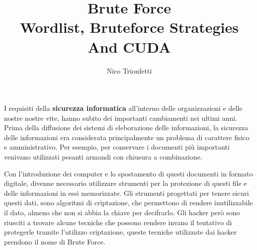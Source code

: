 \documentclass[a4paper]{unicam_thesis}
\title{Brute Force \\ Wordlist, Bruteforce Strategies And CUDA }
\author{Nico Trionfetti}%
\theoremstyle{definition} \newtheorem{esempio}{Esempio}[chapter]
\theoremstyle{definition}
\begin{document}
\maketitle


\tableofcontents

\abstract

I requisiti della \textbf{sicurezza informatica} all'interno delle organizzazioni e delle nostre nostre vite, hanno subito dei importanti cambiamenti nei ultimi anni. Prima della diffusione dei sistemi di eleborazione delle informazioni, la sicurezza delle informazioni era considerata principalmente un problema di carattere fisico e amministrativo. Per esempio, per conservare i documenti più importanti venivano utilizzati pesanti armandi con chiusura a combinazione.

Con l'introduzione dei computer e lo spostamento di questi documenti in formato digitale, divenne necessario utilizzare strumenti per la protezione di questi file e delle informazioni in essi memorizzate. Gli strumenti progettati per tenere sicuri questi dati, sono algoritmi di criptazione, che permettono di rendere inutilizzabile il dato, almeno che non si abbia la chiave per decifrarlo. Gli hacker però sono riusciti a trovare alcune tecniche che possono rendere invano il tentativo di protegerle tramite l'utilizzo criptazione, queste tecniche utilizzate dai hacker prendono il nome di Brute Force. 











\lstlistoflistings
\listoffigures
\listoftables

\appendix
%
%
%

\printbibliography

\printindex


\end{document}

